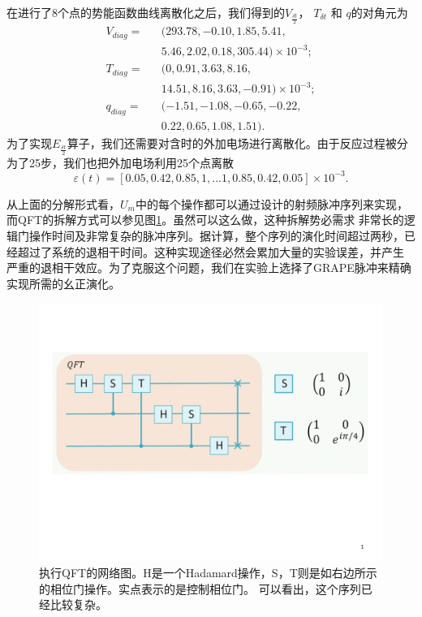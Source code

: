 在进行了8个点的势能函数曲线离散化之后，我们得到的$V_{\frac{\delta t}{2}}$， $T_{\delta t}$ 和 $q$的对角元为
\begin{eqnarray}
  {V}_{diag} =&&(293.78,-0.10,1.85,5.41,\nonumber\\
             &&  5.46,2.02,0.18,305.44)\times 10^{-3};\nonumber\\
  {T}_{diag} =&&(0,0.91,3.63,8.16,\nonumber\\
&&  14.51,8.16,3.63,-0.91)\times 10^{-3};\nonumber\\
  {q}_{diag} =&&(-1.51,-1.08,-0.65,-0.22,\nonumber\\
&&  0.22,0.65,1.08,1.51).
\end{eqnarray}
为了实现$E_{\frac{\delta t}{2}}$算子，我们还需要对含时的外加电场进行离散化。由于反应过程被分为了25步，我们也把外加电场利用25个点离散
\begin{equation}
\varepsilon(t)=[0.05,0.42,0.85,1,...1,0.85,0.42,0.05] \times 10^{-3}.
\end{equation}

从上面的分解形式看，$U_m$中的每个操作都可以通过设计的射频脉冲序列来实现，而QFT的拆解方式可以参见图\ref{qft}。虽然可以这么做，这种拆解势必需求
非常长的逻辑门操作时间及非常复杂的脉冲序列。据计算，整个序列的演化时间超过两秒，已经超过了系统的退相干时间。这种实现途径必然会累加大量的实验误差，并产生
严重的退相干效应。为了克服这个问题，我们在实验上选择了GRAPE脉冲来精确实现所需的幺正演化。

\begin{figure}[htbp]
            \begin{center}
              \includegraphics[width= 0.8\columnwidth]{figures/qft.pdf}
              \caption{执行QFT的网络图。H是一个Hadamard操作，S，T则是如右边所示的相位门操作。实点表示的是控制相位门。
              可以看出，这个序列已经比较复杂。}\label{qft}
            \end{center}
 \end{figure}

